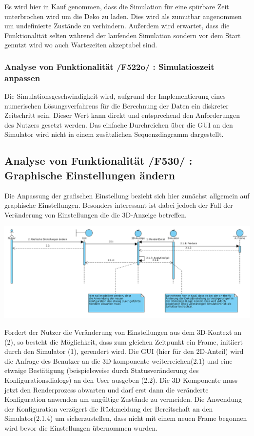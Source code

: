 Es wird hier in Kauf genommen, dass die Simulation für eine spürbare Zeit unterbrochen wird um die Deko zu laden. Dies wird als zumutbar angenommen um undefinierte Zustände zu verhindern. 
Außerdem wird erwartet, dass die Funktionalität selten während der laufenden Simulation sondern vor dem Start genutzt wird wo auch Wartezeiten akzeptabel sind.

\subsubsection{Analyse von Funktionalität /F522o/ :  Simulatioszeit anpassen}
Die Simulationsgeschwindigkeit wird, aufgrund der Implementierung eines numerischen Lösungsverfahrens für die Berechnung der Daten ein diskreter Zeitschritt sein. Dieser Wert kann direkt und entsprechend
den Anforderungen des Nutzers gesetzt werden. Das einfache Durchreichen über die GUI an den Simulator wird nicht in einem zusätzlichen Sequenzdiagramm dargestellt.
\subsection{Analyse von Funktionalität /F530/ :  Graphische Einstellungen ändern}
Die Anpassung der grafischen Einstellung bezieht sich hier zunächst allgemein auf graphische Einstellungen. Besonders interessant ist dabei jedoch der Fall der Veränderung von Einstellungen die 
die 3D-Anzeige betreffen. 

\includegraphics[width=16cm]{bilder/change_graphic_config}

Fordert der Nutzer die Veränderung von Einstellungen aus dem 3D-Kontext an (2), so besteht die Möglichkeit, dass zum gleichen Zeitpunkt ein Frame, initiiert durch den Simulator (1), gerendert wird. 
Die GUI (hier für den 2D-Anteil) wird die Anfrage des Benutzer an die 3D-komponente weiterreichen(2.1) und eine etwaige Bestätigung (beispielsweise durch Statusveränderung des Konfigurationsdialogs) an den 
User ausgeben (2.2). Die 3D-Komponente muss jetzt den Renderprozess abwarten und darf erst dann die veränderte Konfiguration anwenden um ungültige Zustände zu vermeiden. Die Anwendung der Konfiguration verzögert 
die Rückmeldung der Bereitschaft an den Simulator(2.1.4) um sicherzustellen, dass nicht mit einem neuen Frame begonnen wird bevor die Einstellungen übernommen wurden. 

